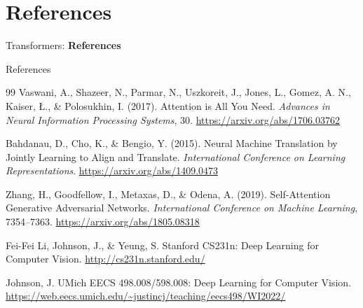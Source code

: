\section{References}
\begin{frame}{}
    \LARGE Transformers: \textbf{References}
\end{frame}

\begin{frame}[allowframebreaks]{References}
    \begin{thebibliography}{99}
        Vaswani, A., Shazeer, N., Parmar, N., Uszkoreit, J., Jones, L., Gomez, A. N., Kaiser, \L., \& Polosukhin, I. (2017).
        Attention is All You Need.
        \emph{Advances in Neural Information Processing Systems}, 30.
        \url{https://arxiv.org/abs/1706.03762}

        Bahdanau, D., Cho, K., \& Bengio, Y. (2015).
        Neural Machine Translation by Jointly Learning to Align and Translate.
        \emph{International Conference on Learning Representations}.
        \url{https://arxiv.org/abs/1409.0473}

        Zhang, H., Goodfellow, I., Metaxas, D., \& Odena, A. (2019).
        Self-Attention Generative Adversarial Networks.
        \emph{International Conference on Machine Learning}, 7354--7363.
        \url{https://arxiv.org/abs/1805.08318}

        Fei-Fei Li, Johnson, J., \& Yeung, S.
        Stanford CS231n: Deep Learning for Computer Vision.
        \url{http://cs231n.stanford.edu/}

        Johnson, J.
        UMich EECS 498.008/598.008: Deep Learning for Computer Vision.
        \url{https://web.eecs.umich.edu/~justincj/teaching/eecs498/WI2022/}
    \end{thebibliography}
\end{frame}
